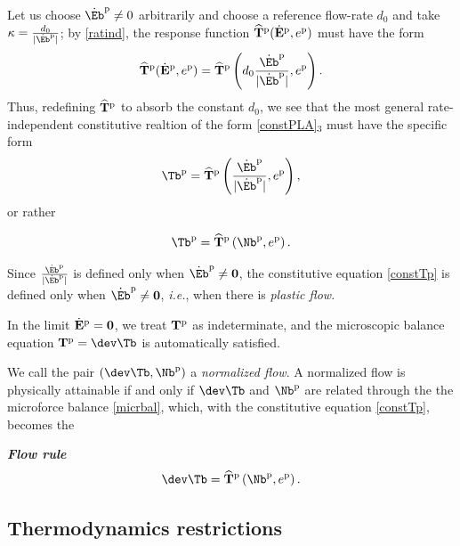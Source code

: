 Let us choose $\dot{\Eb}^{\rm p}\neq 0$ arbitrarily and choose a reference flow-rate $d_0$ and take $\kappa=\frac{d_0}{|\dot{\Eb}^{\rm p}|} $; by \eqref{ratind}, the response function $\widehat{\mathbf{T}}^{\rm p}(\dot{\mathbf{E}}^{\rm p}, e^{\rm p})$ must have the form
\begin{equation}
	\widehat{\mathbf{T}}^{\rm p}(\dot{\mathbf{E}}^{\rm p}, e^{\rm p})=	\widehat{\mathbf{T}}^{\rm p}\left(d_0\frac{\dot{\Eb}^{\rm p}}{|\dot{\Eb}^{\rm p}|} , e^{\rm p}\right).
\end{equation}
Thus, redefining $	\widehat{\mathbf{T}}^{\rm p}$ to absorb the constant $d_0$, we see that the most general rate-independent constitutive realtion of the form \eqref{constPLA}$_3$  must have the specific form
	\begin{equation}
\Tb^{\rm p}=\widehat{\mathbf{T}}^{\rm p}\left(\frac{\dot{\Eb}^{\rm p}}{|\dot{\Eb}^{\rm p}|} , e^{\rm p}\right),
\end{equation}
 or rather 
\begin{definition}
	\begin{equation}\label{constTp}
		\Tb^{\rm p}=\widehat{\mathbf{T}}^{\rm p}\left(\Nb^{\rm p} , e^{\rm p}\right).
	\end{equation}
\end{definition}
Since $\frac{\dot{\Eb}^{\rm p}}{|\dot{\Eb}^{\rm p}|}$ is defined only when $\dot \Eb^{\rm p}\neq \mathbf{0}$, the constitutive equation \eqref{constTp} is defined only when $\dot \Eb^{\rm p}\neq \mathbf{0}$, \textit{i.e.}, when there is \textit{plastic flow}.


In the limit \( \dot{\mathbf{E}}^{\rm p} = \mathbf{0} \), we treat \( \mathbf{T}^{\rm p} \) as indeterminate, and the microscopic balance equation $\mathbf{T}^{\rm p} = \dev \Tb$
is automatically satisfied.

We call the pair $(\dev\Tb, \Nb^{\rm p})$  a \textit{normalized flow}. A normalized flow is physically attainable if and only if $\dev\Tb$ and $\Nb^{\rm p}$ are related through the
 the microforce balance \eqref{micrbal}, which, with the constitutive equation \eqref{constTp}, becomes the
\begin{definition}
\textbf{\textit{Flow rule}}\\
\begin{equation}
	\dev \Tb=\widehat{\mathbf{T}}^{\rm p}\left(\Nb^{\rm p} , e^{\rm p}\right).
\end{equation}
\end{definition}

\subsection{Thermodynamics restrictions}


